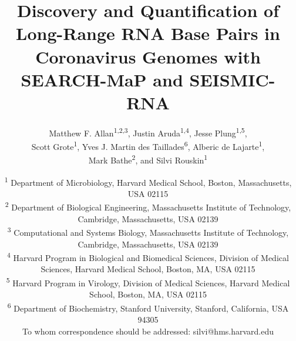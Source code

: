 \documentclass[12pt,a4paper]{article}
\title{Discovery and Quantification of Long-Range RNA Base Pairs in Coronavirus Genomes with SEARCH-MaP and SEISMIC-RNA}
\author{Matthew F. Allan\textsuperscript{1,2,3}, Justin Aruda\textsuperscript{1,4}, Jesse Plung\textsuperscript{1,5}, \\ Scott Grote\textsuperscript{1}, Yves J. Martin des Taillades\textsuperscript{6}, Alberic de Lajarte\textsuperscript{1}, \\ Mark Bathe\textsuperscript{2}, and Silvi Rouskin\textsuperscript{1\textdagger}}
\date{
	\textsuperscript{1} Department of Microbiology, Harvard Medical School, Boston, Massachusetts, USA 02115 \\
	\textsuperscript{2} Department of Biological Engineering, Massachusetts Institute of Technology, Cambridge, Massachusetts, USA 02139 \\
	\textsuperscript{3} Computational and Systems Biology, Massachusetts Institute of Technology, Cambridge, Massachusetts, USA 02139 \\
	\textsuperscript{4} Harvard Program in Biological and Biomedical Sciences, Division of Medical Sciences, Harvard Medical School, Boston, MA, USA 02115 \\
	\textsuperscript{5} Harvard Program in Virology, Division of Medical Sciences, Harvard Medical School, Boston, MA, USA 02115 \\
	\textsuperscript{6} Department of Biochemistry, Stanford University, Stanford, California, USA 94305 \\
	\textsuperscript{\textdagger} To whom correspondence should be addressed: silvi@hms.harvard.edu \\
}
\begin{document}
\emergencystretch \textwidth

\begin{singlespace}
\maketitle
\end{singlespace}
\newpage

\newpage

\newpage

\newpage

\newpage

\newpage


\newpage
\begin{singlespace}
	
	
\end{singlespace}

\newpage

\end{document}
